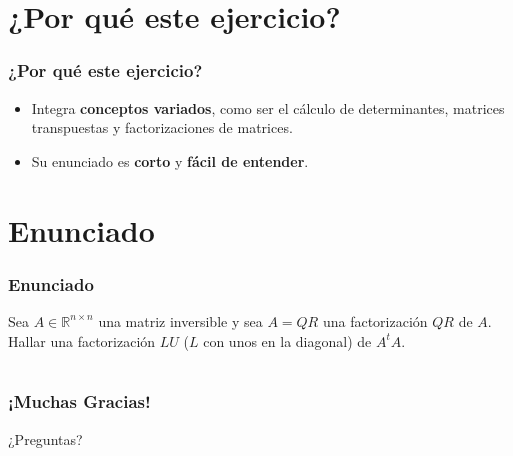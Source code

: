 \documentclass{beamer}
\begin{document}
\section{¿Por qué este ejercicio?}
\begin{frame}
\frametitle{¿Por qué este ejercicio?}
\begin{itemize}
    \item Integra \textbf{conceptos variados}, como ser el
        cálculo de determinantes,
        matrices transpuestas y factorizaciones de matrices.
    \item Su enunciado es \textbf{corto} y
        \textbf{fácil de entender}.
\end{itemize}

\end{frame}

\section{Enunciado}
\begin{frame}
\frametitle{Enunciado}
Sea \( A \in \mathbb{R}^{n \times n} \) una matriz inversible
y sea $A = QR$ una factorización $QR$ de $A$. Hallar una
factorización $LU$ ($L$ con unos en la diagonal) de $A^tA$.
\end{frame}

\section{}
\begin{frame}
\frametitle{¡Muchas Gracias!}
\centering
¿Preguntas?
\end{frame}
\end{document}
